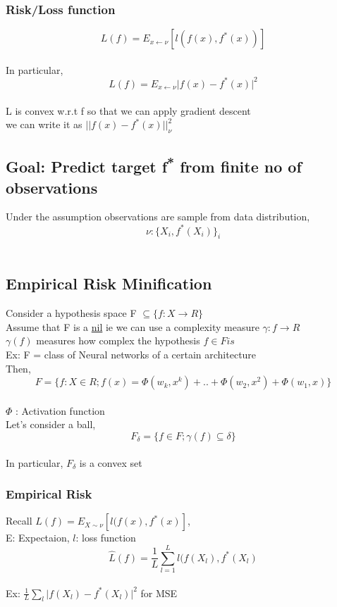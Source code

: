\documentclass[11pt]{article}
\begin{document}
\subsubsection{Risk/Loss function}
\label{sec:org42c28b7}
\[L(f) = E_{x \gets \nu}[l(f(x), f^*(x))] \]\\
In particular,\\
\[ L(f) = E_{x \gets \nu} \lvert f(x) - f^*(x) \rvert^2 \]\\
L is convex w.r.t f so that we can apply gradient descent\\
we can write it as \(\lvert\lvert f(x) - f^*(x) \rvert\rvert ^2_\nu\)\\
\subsection{Goal: Predict target f\textsuperscript{*} from finite no of observations}
\label{sec:orga62a326}
Under the assumption observations are sample from data distribution,\\
\[\nu : \{X_i, f^*(X_i)\}_i \]\\
\subsection{Empirical Risk Minification}
\label{sec:org047d3de}
Consider a hypothesis space F \(\subseteq  \{ f: X \to R \}\)\\
Assume that F is a \href{~/Courses/MathsForDL/References.pdf}{nil} ie we can use a complexity measure \(\gamma:f \to R\)\\
\(\gamma(f)\) measures how complex the hypothesis \(f \in F is\)\\
Ex: F = class of Neural networks of a certain architecture\\
Then,\\
\[ F = \{ f: X \in R; f(x) = \Phi(w_k,x^k)+.. + \Phi(w_2,x^2) + \Phi(w_1,x) \} \]\\
\(\Phi\) : Activation function\\
Let's consider a ball,\\
\[F_\delta = \{ f \in F; \gamma(f) \subseteq \delta \} \]\\
In particular, \(F_\delta\) is a convex set\\
\subsubsection{Empirical Risk}
\label{sec:org2ace4c2}
Recall  \(L(f) = E_{X \sim \nu}[l(f(x),f^*(x)]\),\\
E: Expectaion, \(l\): loss function\\
\[\hat{L}(f) = \frac{1}{L} \sum_{l=1}^L l(f(X_l), f^*(X_l) \]\\
Ex: \(\frac{1}{L} \sum_l \lvert f(X_l) - f^*(X_l) \rvert ^2\) for MSE\\
\end{document}
